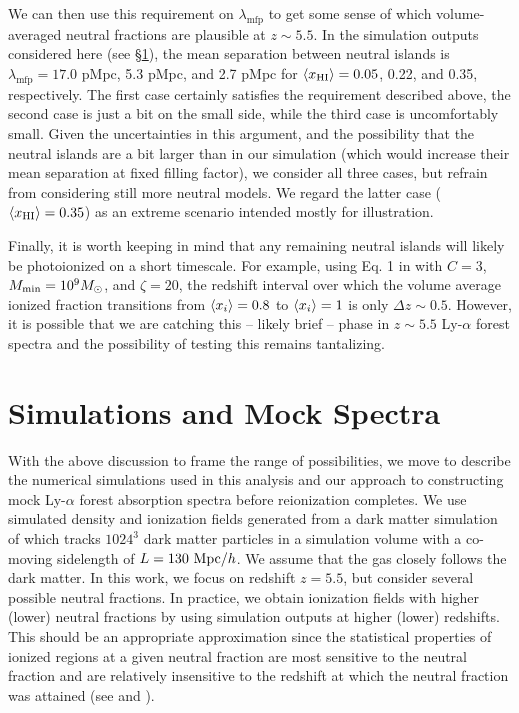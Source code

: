We can then use this requirement on $\lambda_{\text{mfp}}$ to get some sense of which volume-averaged neutral fractions are plausible at $z \sim 5.5$. In the simulation outputs considered here (see \S\ref{sec:NeutralIslandsSims}), the 
mean separation between neutral islands is $\lambda_{\text{mfp}} = 17.0$ pMpc, 5.3 pMpc, and 2.7 pMpc for $\langle x_{\text{HI}}\rangle = 0.05$, 0.22, and 0.35, respectively. The first case certainly satisfies
the requirement described above, the second case is just a bit on the small side, while the third case is uncomfortably small. Given the uncertainties in this argument, and the possibility that the neutral
islands are a bit larger than in our simulation (which would increase their mean separation at fixed filling factor), we consider all three cases, but refrain from considering still more neutral models. We regard the latter case ($\langle x_{\text{HI}}\rangle = 0.35$) as an extreme scenario intended mostly for illustration. 

 
Finally, it is worth keeping in mind that any remaining neutral islands will likely be photoionized on a short timescale. For example, using Eq. 1 in \citet{Lidz:2014jxa} with $C=3$, $M_{\rm min} = 10^9 M_\odot$, and
$\zeta = 20$, the redshift interval over which the volume average ionized fraction transitions from $\langle x_i \rangle = 0.8$ to $\langle x_i \rangle=1$ is only $\Delta z \sim 0.5$. 
However, it is possible that we
are catching this -- likely brief -- phase in $z \sim 5.5$ Ly-$\alpha$ forest
spectra and the possibility of testing this remains tantalizing.


\section{Simulations and Mock Spectra} \label{sec:NeutralIslandsSims}


With the above discussion to frame the range of possibilities, we move to describe the numerical simulations used in this analysis and our approach to constructing mock Ly-$\alpha$ forest
absorption spectra before reionization completes. We use simulated density and ionization fields generated from a dark matter simulation of \citet{McQuinn:2007dy} which tracks $1024^{3}$ dark matter particles in a simulation volume with a co-moving sidelength of $L = 130\ \text{Mpc/$h$}$. We assume that the gas closely follows the dark matter. In this work, we focus on redshift $z = 5.5$, but consider several possible neutral fractions. In practice, we obtain ionization fields with higher (lower) neutral fractions by using simulation outputs at higher (lower) redshifts. This should be an appropriate approximation since the statistical properties of ionized regions at a given neutral fraction are most sensitive to the neutral fraction and are relatively insensitive to the redshift at which the neutral fraction was attained (see \citealt{McQuinn:2006et} and \citealt{Furlanetto:2004nh}).
 

